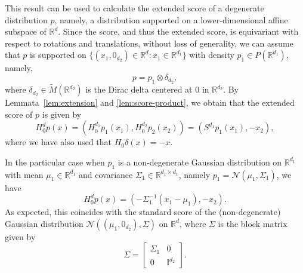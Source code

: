 \documentclass{article}
\newcommand{\R}{\mathbb{R}}
\theoremstyle{plain}
\theoremstyle{definition}
\theoremstyle{remark}
\begin{document}
This result can be used to calculate the extended score of a degenerate distribution $p$, namely, a distribution supported on a lower-dimensional affine subspace of $\R^d$. Since the score, and thus the extended score, is equivariant with respect to rotations and translations, without loss of generality, we can assume that $p$ is supported on $\{(x_1,0_{d_2})\in\R^d:x_1\in\R^{d_1}\}$ with density $p_1\in P(\R^{d_1})$, namely,
\[
p=p_1\otimes \delta_{d_2},
\]
where $\delta_{d_2}\in\widetilde{M}(\R^{d_2})$ is the Dirac delta centered at $0$ in $\R^{d_2}$. By Lemmata~\ref{lem:extension} and \ref{lem:score-product}, we obtain that the extended score of $p$ is given by
\[
H_0^d p(x) = (H^{d_1}_0 p_1(x_1),H_0^{d_2} p_2(x_2))
= (S^{d_1} p_1(x_1),-x_2),
\]
where we have also used that $H_0\delta(x)=-x$.

In the particular case when $p_1$ is a non-degenerate Gaussian distribution on $\R^{d_1}$ with mean $\mu_1\in\R^{d_1}$ and covariance $\Sigma_1\in\R^{d_1\times d_1}$, namely $p_1=\mathcal{N}(\mu_1,\Sigma_1)$, we have
\[
H_0^d p(x) = (-\Sigma_1^{-1}(x_1-\mu_1),-x_2).
\]
As expected, this coincides with the standard score of the (non-degenerate) Gaussian distribution $\mathcal{N}((\mu_1,0_{d_2}),\Sigma)$ on $\R^d$, where $\Sigma$ is the block matrix given by
\[
\Sigma= \begin{bmatrix}
    \Sigma_1 & 0\\
    0& \mathbb{I}^{d_2}
\end{bmatrix}.
\]
\end{document}
